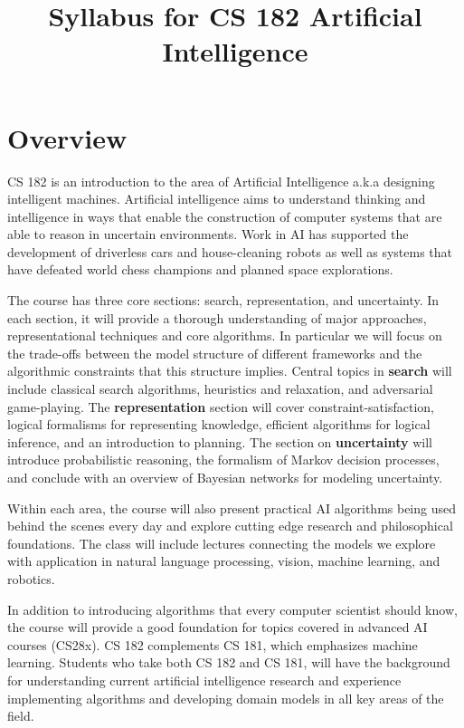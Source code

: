 \documentclass[11pt]{article}
\title{Syllabus for CS 182 Artificial Intelligence}
\date{}
\begin{document}
\maketitle{}

\vspace{-1.75cm}
\section{Overview}

CS 182 is an introduction to the area of
Artificial Intelligence a.k.a designing intelligent
machines. Artificial intelligence aims to understand thinking and
intelligence in ways that enable the construction of computer systems
that are able to reason in uncertain environments. Work in AI has
supported the development of driverless cars and house-cleaning
robots as well as systems that have defeated world chess champions and
planned space explorations.

The course has three core sections: search, representation, and
uncertainty.  In each section, it will provide a thorough
understanding of major approaches, representational techniques and
core algorithms. In particular we will focus on the trade-offs between
the model structure of different frameworks and the algorithmic
constraints that this structure implies. Central topics in
\textbf{search} will include classical search algorithms, heuristics
and relaxation, and adversarial game-playing.  The
\textbf{representation} section will cover constraint-satisfaction,
logical formalisms for representing knowledge, efficient algorithms
for logical inference, and an introduction to planning. The section on
\textbf{uncertainty} will introduce probabilistic reasoning, the
formalism of Markov decision processes, and conclude with an overview of 
Bayesian networks for modeling uncertainty.

Within each area, the course will also present practical AI algorithms
being used behind the scenes every day and explore cutting edge
research and philosophical foundations.  The class will include
lectures connecting the models we explore with application in natural
language processing, vision, machine learning, and robotics.

In addition to introducing algorithms that every computer scientist
should know, the course will provide a good foundation for topics
covered in advanced AI courses (CS28x). CS 182 complements CS 181,
which emphasizes machine learning. Students who take both CS 182 and
CS 181, will have the background for understanding current artificial
intelligence research and experience implementing algorithms and
developing domain models in all key areas of the field.
\end{document}
